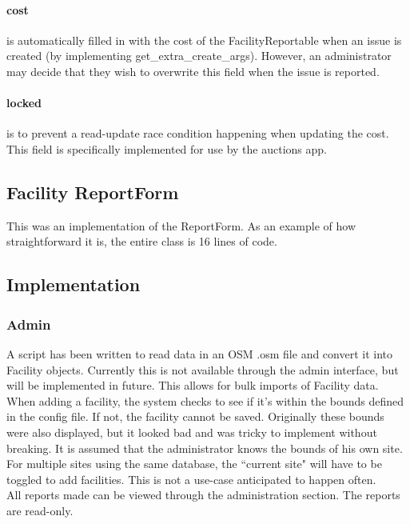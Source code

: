\paragraph{cost} is automatically filled in with the cost of the FacilityReportable when an issue is created (by implementing get\_extra\_create\_args). However, an administrator may decide that they wish to overwrite this field when the issue is reported.

\paragraph{locked} is to prevent a read-update race condition happening when updating the cost. This field is specifically implemented for use by the auctions app.

\subsection{Facility ReportForm}
This was an implementation of the ReportForm. As an example of how straightforward it is, the entire class is 16 lines of code.

\subsection{Implementation}
\subsubsection{Admin}
A script has been written to read data in an \gls{OSM} .osm file and convert it into Facility objects. Currently this is not available through the admin interface, but will be implemented in future. This allows for bulk imports of Facility data. \\

When adding a facility, the system checks to see if it's within the bounds defined in the config file. If not, the facility cannot be saved. Originally these bounds were also displayed, but it looked bad and was tricky to implement without breaking. It is assumed that the administrator knows the bounds of his own site. For multiple sites using the same database, the ``current site" will have to be toggled to add facilities. This is not a use-case anticipated to happen often. \\

All reports made can be viewed through the administration section. The reports are read-only. \\

